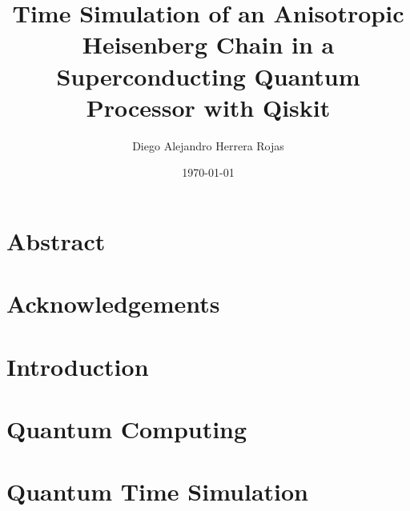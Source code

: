 \documentclass[12pt,twoside]{report}
\title{Time Simulation of an Anisotropic Heisenberg Chain in a Superconducting Quantum Processor with Qiskit}
\author{Diego Alejandro Herrera Rojas}
\date{\today}
\begin{document}
  
  \tableofcontents
  \chapter*{Abstract}
  \label{abstract}
  
  \chapter*{Acknowledgements}
  \label{ackn}
  
  \chapter{Introduction}
  \label{chap:intro}
  
  \chapter{Quantum Computing}
  \label{chap:qc}
  
  \chapter{Quantum Time Simulation}
  \label{chap:qts}
  
\end{document}
